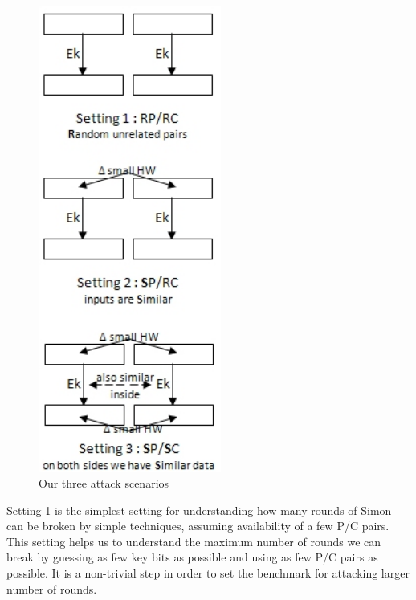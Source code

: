 \begin{figure}[!h]
	\vspace{-0.2cm}
	\centering
	\includegraphics*[width=60mm]{./pics/three_scenarios2.jpg}
	\caption{Our three attack scenarios}
	\label{ThreeScenarios}
	\vspace{-0.1cm}
\end{figure}




Setting 1 is the simplest setting for understanding how many rounds of Simon
can be broken by simple techniques, assuming availability of
a few P/C pairs. This setting helps us to understand the maximum number of rounds we
can break by guessing as few key bits as possible and using as few  P/C
pairs as possible. It is a non-trivial step in order to set the benchmark for attacking larger number of rounds.


